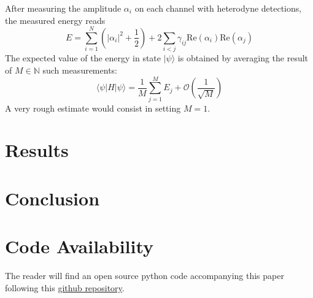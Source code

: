 \documentclass[reprint, amsmath, amssymb, aps]{revtex4-2}
\begin{document}
    After measuring the amplitude $\alpha_i$ on each channel with heterodyne detections, the measured energy reads
    \begin{equation}
    \label{eq:energy_coherent}
        E = \sum_{i=1}^N\left(|\alpha_i|^2+\frac{1}{2}\right) + 2\sum_{i<j}\gamma_{ij}\text{Re}(\alpha_i)\text{Re}(\alpha_j)
    \end{equation}
    The expected value of the energy in state $|\psi\rangle$ is obtained by averaging the result of $M\in\mathbb N$ such measurements:
    \begin{equation}
        \langle\psi|H|\psi\rangle = \frac{1}{M}\sum_{j=1}^M E_j + \mathcal O\left(\frac{1}{\sqrt M}\right)
    \end{equation}
    A very rough estimate would consist in setting $M=1$.

\section{Results}
\section{Conclusion}

\begin{acknowledgments}

\end{acknowledgments}

\section*{Code Availability}

The reader will find an open source python code accompanying this paper following this \href{https://github.com/MatthieuSarkis/qdo}{github repository}.

\appendix

\nocite{*}


\end{document}
